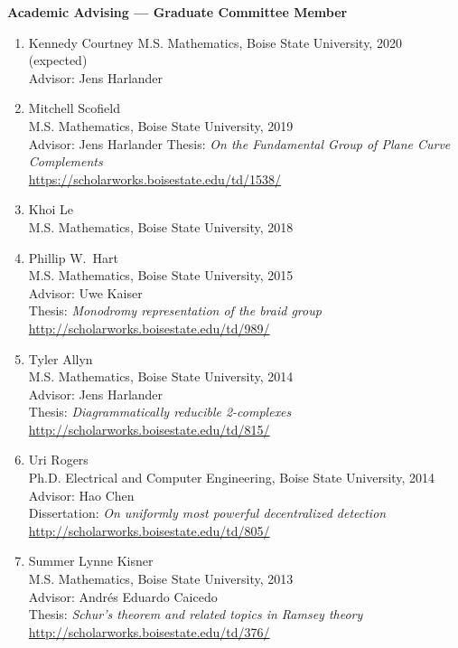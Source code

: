 \documentclass[12pt]{article}
\begin{document}
\textbf{Academic Advising --- Graduate Committee Member}
\begin{enumerate}[revarabic]

\item Kennedy Courtney
M.S. Mathematics, Boise State University, 2020 (expected) \\
Advisor: Jens Harlander

\item Mitchell Scofield \\
M.S. Mathematics, Boise State University, 2019 \\
Advisor: Jens Harlander
Thesis: \emph{On the Fundamental Group of Plane Curve Complements} \\
\url{https://scholarworks.boisestate.edu/td/1538/}

\item Khoi Le \\
M.S. Mathematics, Boise State University, 2018 \\

\item Phillip W.\ Hart \\
M.S. Mathematics, Boise State University, 2015 \\
Advisor: Uwe Kaiser \\
Thesis: \emph{Monodromy representation of the braid group} \\
\url{http://scholarworks.boisestate.edu/td/989/}

\item Tyler Allyn \\
M.S. Mathematics, Boise State University, 2014 \\
Advisor: Jens Harlander \\
Thesis: \emph{Diagrammatically reducible 2-complexes} \\
\url{http://scholarworks.boisestate.edu/td/815/}

\item Uri Rogers \\
Ph.D. Electrical and Computer Engineering, Boise State University, 2014 \\
Advisor: Hao Chen \\
Dissertation: \emph{On uniformly most powerful decentralized detection} \\
\url{http://scholarworks.boisestate.edu/td/805/}

\item Summer Lynne Kisner \\
M.S. Mathematics, Boise State University, 2013 \\
Advisor: Andr\'es Eduardo Caicedo \\
Thesis: \emph{Schur's theorem and related topics in Ramsey theory} \\
\url{http://scholarworks.boisestate.edu/td/376/}


\end{enumerate}
\end{document}

